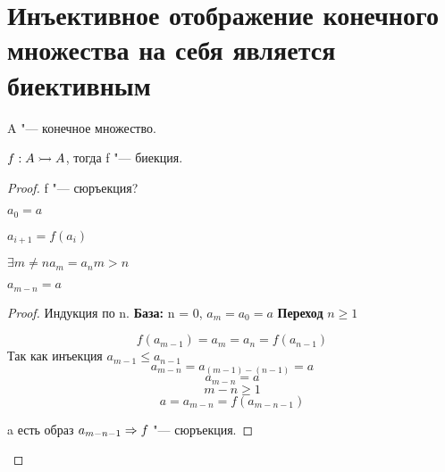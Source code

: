 ﻿\section{Инъективное отображение конечного множества на себя является биективным}

\begin{theorem}{}
A "--- конечное множество. 

$f: A \rightarrowtail A $, тогда f "--- биекция.
\end{theorem}

\begin{proof}
f "--- сюръекция? 

$a_0 = a$

$a_{i + 1} = f(a_i)$

$\exists m \ne n a_m = a_n m > n$

\begin{lemma}{}
    $a_{m - n} = a$    
\end{lemma}
    \begin{proof}
        Индукция по n.
        {\bf База:} n = 0, $a_m = a_0 = a$
        {\bf Переход} $n \ge 1$

        $$f(a_{m - 1}) = a_m = a_n = f(a_{n - 1})$$
        Так как инъекция $a_{m - 1} \le a_{n - 1}$
        $$a_{m - n} = a_{(m - 1) - (n - 1)} = a$$
        $$a_{m - n} = a$$
        $$m - n \ge 1$$
        $$a = a_{m - n} = f(a_{m - n - 1})$$

        a есть образ $a_{m - n - 1} \Rightarrow f$ "--- сюръекция.
    \end{proof}
\end{proof}